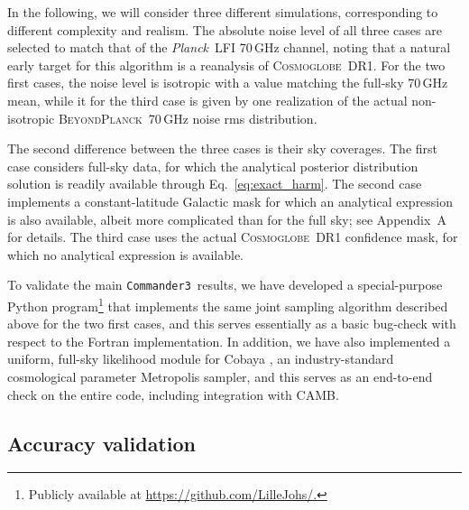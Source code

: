 \documentclass[twocolumn]{../common/aa}
\def\Planck{\emph{Planck}}
\def\commanderthree{\texttt{Commander3}}
\newcommand{\BP}{\textsc{BeyondPlanck}}
\newcommand{\cosmoglobe}{\textsc{Cosmoglobe}}
\begin{document}
In the following, we will consider three different simulations, corresponding to different complexity and realism. The absolute noise level of all three cases are selected to match that of the \Planck\ LFI 70\,GHz channel, noting that a natural early target for this algorithm is a reanalysis of \cosmoglobe\ DR1. For the two first cases, the noise level is isotropic with a value matching the full-sky 70\,GHz mean, while it for the third case is given by one realization of the actual non-isotropic \BP\ 70\,GHz noise rms distribution.

The second difference between the three cases is their sky coverages. The first case considers full-sky data, for which the analytical posterior distribution solution is readily available through Eq.~\eqref{eq:exact_harm}. The second case implements a constant-latitude Galactic mask for which an analytical expression is also available, albeit more complicated than for the full sky; see Appendix~A for details. The third case uses the actual \cosmoglobe\ DR1 confidence mask, for which no analytical expression is available. 

To validate the main \commanderthree\ results, we have developed a special-purpose Python program\footnote{Publicly available at \url{https://github.com/LilleJohs/.}} that implements the same joint sampling algorithm described above for the two first cases, and this serves essentially as a basic bug-check with respect to the Fortran implementation. In addition, we have also implemented a uniform, full-sky likelihood module for Cobaya \citep{Torrado:2020dgo}, an industry-standard cosmological parameter Metropolis sampler, and this serves as an end-to-end check on the entire code, including integration with CAMB.

\subsection{Accuracy validation}
\end{document}
